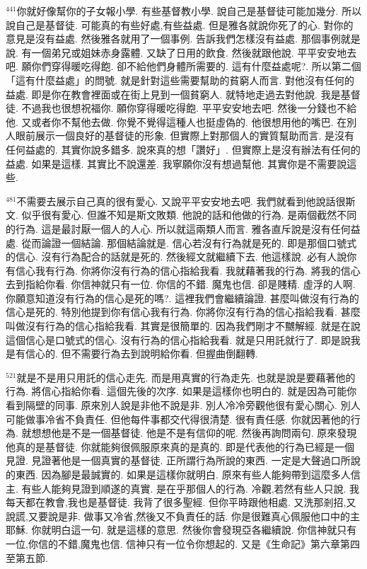 \documentclass{book}
\begin{document}
$^{441}$你就好像幫你的子女報小學.
有些基督教小學.
說自己是基督徒可能加幾分.
所以說自己是基督徒.
可能真的有些好處,有些益處.
但是雅各就說你死了的心.
對你的意見是沒有益處.
然後雅各就用了一個事例.
告訴我們怎樣沒有益處.
那個事例就是說.
有一個弟兄或姐妹赤身露體.
又缺了日用的飲食.
然後就跟他說.
平平安安地去吧.
願你們穿得暖吃得飽.
卻不給他們身體所需要的.
這有什麼益處呢?.
所以第二個「這有什麼益處」的問號.
就是針對這些需要幫助的貧窮人而言.
對他沒有任何的益處.
即是你在教會裡面或在街上見到一個貧窮人.
就特地走過去對他說.
我是基督徒.
不過我也很想祝福你.
願你穿得暖吃得飽.
平平安安地去吧.
然後一分錢也不給他.
又或者你不幫他去做.
你覺不覺得這種人也挺虛偽的.
他很想用他的嘴巴.
在別人眼前展示一個良好的基督徒的形象.
但實際上對那個人的實質幫助而言.
是沒有任何益處的.
其實你說多錯多.
說來真的想「讚好」.
但實際上是沒有辦法有任何的益處.
如果是這樣.
其實比不說還差.
我寧願你沒有想過幫他.
其實你是不需要說這些.

$^{481}$不需要去展示自己真的很有愛心.
又說平平安安地去吧.
我們就看到他說話很斯文.
似乎很有愛心.
但誰不知是斯文敗類.
他說的話和他做的行為.
是兩個截然不同的行為.
這是最討厭一個人的人心.
所以就這兩類人而言.
雅各直斥說是沒有任何益處.
從而論證一個結論.
那個結論就是.
信心若沒有行為就是死的.
即是那個口號式的信心.
沒有行為配合的話就是死的.
然後經文就繼續下去.
他這樣說.
必有人說你有信心我有行為.
你將你沒有行為的信心指給我看.
我就藉著我的行為.
將我的信心去到指給你看.
你信神就只有一位.
你信的不錯.
魔鬼也信.
卻是賤精.
虛浮的人啊.
你願意知道沒有行為的信心是死的嗎?.
這裡我們會繼續論證.
甚麼叫做沒有行為的信心是死的.
特別他提到你有信心我有行為.
你將你沒有行為的信心指給我看.
甚麼叫做沒有行為的信心指給我看.
其實是很簡單的.
因為我們剛才不嬲解經.
就是在說這個信心是口號式的信心.
沒有行為的信心指給我看.
就是只用託就行了.
即是說我是有信心的.
但不需要行為去到說明給你看.
但握曲倒翻轉.

$^{521}$就是不是用只用託的信心走先.
而是用真實的行為走先.
也就是說是要藉著他的行為.
將信心指給你看.
這個先後的次序.
如果是這樣你也明白的.
就是因為可能你看到隔壁的同事.
原來別人說是非他不說是非.
別人冷冷旁觀他很有愛心關心.
別人可能做事冷省不負責任.
但他每件事都交代得很清楚.
很有責任感.
你就因著他的行為.
就想想他是不是一個基督徒.
他是不是有信仰的呢.
然後再詢問兩句.
原來發現他真的是基督徒.
你就能夠很佩服原來真的是真的.
即是代表他的行為已經是一個見證.
見證著他是一個真實的基督徒.
正所謂行為所說的東西.
一定是大聲過口所說的東西.
因為腳是最誠實的.
如果是這樣你就明白.
原來有些人能夠帶到這麼多人信主.
有些人能夠見證到順遂的真實.
是在乎那個人的行為.
冷觀,若然有些人只說.
我每天都在教會,我也是基督徒.
我背了很多聖經.
但你平時跟他相處.
又洗那剎招,又說謊,又要說是非.
做事又冷省,然後又不負責任的話.
你是很難真心佩服他口中的主耶穌.
你就明白這一句.
就是這樣的意思.
然後你會發現亞各繼續說.
你信神就只有一位,你信的不錯,魔鬼也信.
信神只有一位令你想起的.
又是《生命記》第六章第四至第五節.
\end{document}
